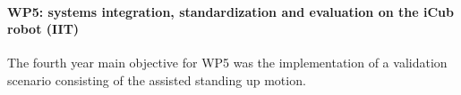 \paragraph{WP5: systems integration, standardization and evaluation on the iCub robot (IIT)}

The fourth year main objective for WP5 was the implementation of a validation scenario consisting of the assisted standing up motion.
